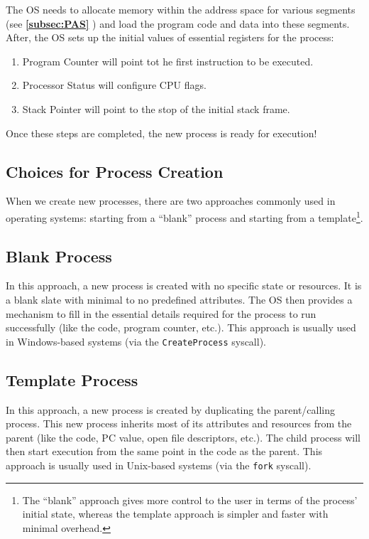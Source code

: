 \documentclass{report}
\newcommand{\refto}[2]{\textbf{\ref{#1:#2} \nameref{#1:#2}}}
\begin{document}
The OS needs to allocate memory within the address space for various segments (see \refto{subsec}{PAS})
and load the program code and data into these segments. After, the OS sets up the initial values of
essential registers for the process:
\begin{enumerate}[label=\textit{(\roman*)}]
\item Program Counter will point tot he first instruction to be executed.
\item Processor Status will configure CPU flags.
\item Stack Pointer will point to the stop of the initial stack frame.
\end{enumerate}
Once these steps are completed, the new process is ready for execution!


\subsection{Choices for Process Creation}
When we create new processes, there are two approaches commonly used in operating systems: starting
from a ``blank'' process and starting from a template\footnote{The ``blank'' approach gives more
  control to the user in terms of the process' initial state, whereas the template approach is
  simpler and faster with minimal overhead.}.

\subsection*{Blank Process}
In this approach, a new process is created with no specific state or resources. It is a blank slate
with minimal to no  predefined attributes. The OS then provides a mechanism to fill in the
essential details required for the process to run successfully (like the code, program counter,
etc.). This approach is usually used in Windows-based systems (via the \texttt{CreateProcess} syscall).

\subsection*{Template Process}
In this approach, a new process is created by duplicating the parent/calling process. This new
process inherits most of its attributes and resources from the parent (like the code, PC value, open
file descriptors, etc.). The child process will then start execution from the same point in the
code as the parent. This approach is usually used in Unix-based systems (via the \texttt{fork}
syscall).
\end{document}
